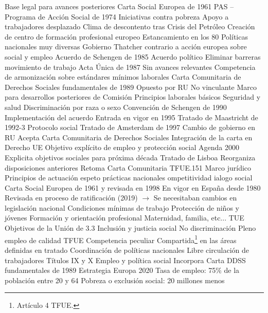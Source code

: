 \documentclass{nuevotema}
\begin{document}
\begin{esquemal}
				\4 Base legal para avances posteriores
			\3 Carta Social Europea de 1961
			\3 PAS -- Programa de Acción Social de 1974
				\4 Iniciativas contra pobreza
				\4 Apoyo a trabajadores desplazado
				\4 Clima de descontento tras Crisis del Petróleo
				\4 Creación de centro de formación profesional europeo
			\3 Estancamiento en los 80
				\4 Políticas nacionales muy diversas
				\4 Gobierno Thatcher contrario a acción europea sobre social y empleo
			\3 Acuerdo de Schengen de 1985
				\4 Acuerdo político
				\4 Eliminar barreras movimiento de trabajo
			\3 Acta Única de 1987
				\4 Sin avances relevantes
				\4 Competencia de armonización sobre estándares mínimos laborales
			\3 Carta Comunitaria de Derechos Sociales fundamentales de 1989
				\4 Opuesto por RU
				\4 No vinculante
				\4 Marco para desarrollos posteriores de Comisión
				\4 Principios laborales básicos
				\4[] Seguridad y salud
				\4[] Discriminación por raza o sexo
			\3 Convención de Schengen de 1990
				\4 Implementación del acuerdo
				\4 Entrada en vigor en 1995
			\3 Tratado de Maastricht de 1992-3
				\4 Protocolo social
			\3 Tratado de Amsterdam de 1997
				\4 Cambio de gobierno en RU
				\4[] Acepta Carta Comunitaria de Derechos Sociales
				\4 Integración de la carta en Derecho UE
				\4 Objetivo explícito de empleo y protección social
			\3 Agenda 2000
				\4 Explicita objetivos sociales para próxima década
			\3 Tratado de Lisboa
				\4 Reorganiza disposiciones anteriores
				\4 Retoma Carta Comunitaria
				\4[] TFUE.151
		\2 Marco jurídico
			\3 Principios de actuación
				\4 espeto prácticas nacionales
				\4 ompetitividad
				\4 ialogo social
			\3 Carta Social Europea de 1961 y revisada en 1998
				\4 En vigor en España desde 1980
				\4 Revisada en proceso de ratificación (2019)
				\4[] $\to$ Se necesitaban cambios en legislación nacional
				\4 Condiciones mínimas de trabajo
				\4 Protección de niños y jóvenes
				\4 Formación y orientación profesional
				\4 Maternidad, familia, etc...
			\3 TUE
				\4 Objetivos de la Unión de 3.3
				\4[] Inclusión y justicia social
				\4[] No discriminación
				\4[] Pleno empleo de calidad
			\3 TFUE
				\4 Competencia peculiar
				\4[] Compartida\footnote{Artículo 4 TFUE.} en las áreas definidas en tratado
				\4 Coordinación de políticas nacionales
				\4 Libre circulación de trabajadores
				\4 Títulos IX y X
				\4[] Empleo y política social
				\4 Incorpora Carta DDSS fundamentales de 1989
			\3 Estrategia Europa 2020
				\4 Tasa de empleo: 75\% de la población entre 20 y 64
				\4 Pobreza o exclusión social: 20 millones menos

\end{esquemal}
\end{document}
